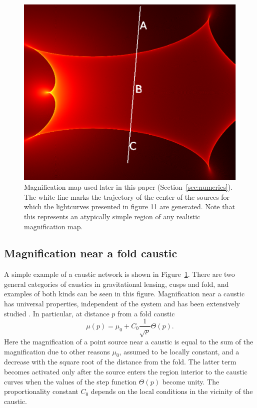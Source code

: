 \documentclass[usenatbib]{mn2e}
\begin{document}
\begin{figure}
\centering
\includegraphics[width=0.9\hsize]{figures/IRIS567_path.eps}
\caption{\label{fig:magnification_map} Magnification map used later in
  this paper (Section~\ref{sec:numerics}). The white line marks the
  trajectory of the center of the sources for which the lightcurves
  presented in figure 11 are generated.  Note that this represents an
  atypically simple region of any realistic magnification map.}
\end{figure}


\subsection{Magnification near a fold caustic}

A simple example of a caustic network is shown in
Figure~\ref{fig:magnification_map}.  There are two general categories
of caustics in gravitational lensing, cusps and fold, and examples of
both kinds can be seen in this figure.  Magnification near a caustic
has universal properties, independent of the system and has been
extensively studied
\citep{1986ApJ...310..568B,1992A&A...260....1S,2002ApJ...574..970G,2002ApJ...580..468G}.
In particular, at distance $p$ from a fold caustic
\begin {equation}
 \mu(p) = \mu_0 + C_0 \frac{1}{\sqrt{p}} \Theta(p).
\end {equation}
Here the magnification of a point source near a caustic is equal to
the sum of the magnification due to other reasons $\mu_0$, assumed to
be locally constant, and a decrease with the square root of the
distance from the fold. The latter term becomes activated only after
the source enters the region interior to the caustic curves when the
values of the step function $\Theta(p)$ become unity. The
proportionality constant $C_0$ depends on the local conditions in the
vicinity of the caustic.
\end{document}
